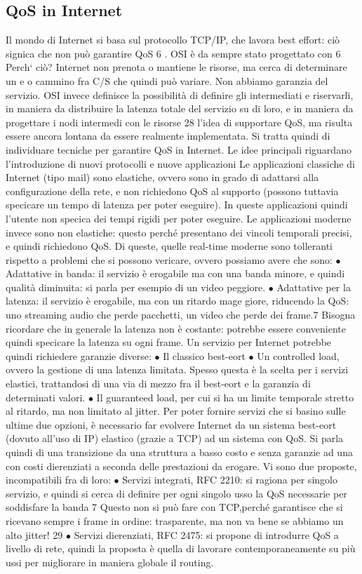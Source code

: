 \subsection{QoS in Internet}
Il mondo di Internet si basa sul protocollo TCP/IP, che lavora best effort: ciò
signica che non può garantire QoS 6 . OSI è da sempre stato progettato con
6 Perch` ciò? Internet non prenota o mantiene le risorse, ma cerca di determinare un
e o
cammino fra C/S che quindi può variare. Non abbiamo garanzia del servizio. OSI invece
definisce la possibilità di definire gli intermediati e riservarli, in maniera da distribuire la
latenza totale del servizio su di loro, e in maniera da progettare i nodi intermedi con le risorse
28
l'idea di supportare QoS, ma risulta essere ancora lontana da essere realmente
implementata. Si tratta quindi di individuare tecniche per garantire QoS in Internet. Le idee principali riguardano
l'introduzione di nuovi protocolli e nuove
applicazioni
Le applicazioni classiche di Internet (tipo mail) sono elastiche, ovvero sono
in grado di adattarsi alla configurazione della rete, e non richiedono QoS al
supporto (possono tuttavia specicare un tempo di latenza per poter eseguire).
In queste applicazioni quindi l'utente non specica dei tempi rigidi per poter
eseguire.
Le applicazioni moderne invece sono non elastiche: questo perché presentano
dei vincoli temporali precisi, e quindi richiedono QoS. Di queste, quelle real-time
moderne sono tolleranti rispetto a problemi che si possono vericare, ovvero
possiamo avere che sono:
$\bullet$ Adattative in banda: il servizio è erogabile ma con una banda minore, e
quindi qualità diminuita: si parla per esempio di un video peggiore.
$\bullet$ Adattative per la latenza: il servizio è erogabile, ma con un ritardo mage
giore, riducendo la QoS: uno streaming audio che perde pacchetti, un video
che perde dei frame.7
Bisogna ricordare che in generale la latenza non è costante: potrebbe essere
conveniente quindi specicare la latenza su ogni frame.
Un servizio per Internet potrebbe quindi richiedere garanzie diverse:
$\bullet$ Il classico best-eort
$\bullet$ Un controlled load, ovvero la gestione di una latenza limitata. Spesso
questa è la scelta per i servizi elastici, trattandosi di una via di mezzo fra
il best-eort e la garanzia di determinati valori.
$\bullet$ Il guaranteed load, per cui si ha un limite temporale stretto al ritardo, ma
non limitato al jitter.
Per poter fornire servizi che si basino sulle ultime due opzioni, è necessario
far evolvere Internet da un sistema best-eort (dovuto all'uso di IP) elastico
(grazie a TCP) ad un sistema con QoS. Si parla quindi di una transizione da
una struttura a basso costo e senza garanzie ad una con costi dierenziati a
seconda delle prestazioni da erogare. Vi sono due proposte, incompatibili fra di
loro:
$\bullet$ Servizi integrati, RFC 2210: si ragiona per singolo servizio, e quindi si
cerca di definire per ogni singolo usso la QoS
necessarie per soddisfare la banda
7 Questo non si può fare con TCP,perché garantisce che si ricevano sempre i frame in ordine:
trasparente, ma non va bene se abbiamo un alto jitter!
29
$\bullet$ Servizi dierenziati, RFC 2475: si propone di introdurre QoS a livello di
rete, quindi la proposta è quella di lavorare contemporaneamente su più
ussi per migliorare in maniera globale il routing.
